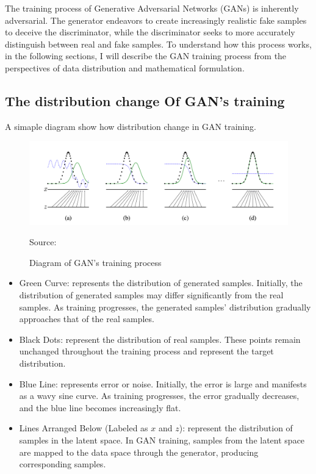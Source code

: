 The training process of Generative Adversarial Networks (GANs) is inherently adversarial. 
The generator endeavors to create increasingly realistic fake samples to deceive the discriminator, 
while the discriminator seeks to more accurately distinguish between real and fake samples. 
To understand how this process works, in the following sections, 
I will describe the GAN training process from the perspectives of data distribution and mathematical formulation.

\subsection{The distribution change Of GAN's training}
A simaple diagram show how distribution change in GAN training.


\begin{figure}[H]
    \centering
    \includegraphics[width=1.2\linewidth]{./Images/data_distribution.jpg}
    \caption{Diagram of GAN's training process}
    \label{fig:my_picture}
    \vspace{1pt} %
    \small{Source: \cite{goodfellow2014generative}}
\end{figure}


\begin{itemize}
    \item Green Curve: represents the distribution of generated samples. Initially, the distribution of generated samples may differ significantly from the real samples. As training progresses, the generated samples’ distribution gradually approaches that of the real samples.
    \item Black Dots: represent the distribution of real samples. These points remain unchanged throughout the training process and represent the target distribution.
    \item Blue Line: represents error or noise. Initially, the error is large and manifests as a wavy sine curve. As training progresses, the error gradually decreases, and the blue line becomes increasingly flat.
    \item Lines Arranged Below (Labeled as $x$ and $z$): represent the distribution of samples in the latent space. In GAN training, samples from the latent space are mapped to the data space through the generator, producing corresponding samples.
\end{itemize}


